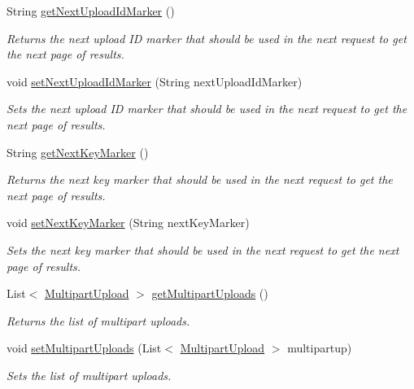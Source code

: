 \begin{DoxyCompactItemize}
String \hyperlink{classorg_1_1jcs_1_1dss_1_1main_1_1MultipartUploadListing_a1d18addca6cd5af22f70b7beb16a60d3}{get\+Next\+Upload\+Id\+Marker} ()
\begin{DoxyCompactList}\small\item\em Returns the next upload ID marker that should be used in the next request to get the next page of results. \end{DoxyCompactList}\item 
void \hyperlink{classorg_1_1jcs_1_1dss_1_1main_1_1MultipartUploadListing_a9e0f89f2000c7ee64390ee7a2616587a}{set\+Next\+Upload\+Id\+Marker} (String next\+Upload\+Id\+Marker)
\begin{DoxyCompactList}\small\item\em Sets the next upload ID marker that should be used in the next request to get the next page of results. \end{DoxyCompactList}\item 
String \hyperlink{classorg_1_1jcs_1_1dss_1_1main_1_1MultipartUploadListing_a3eb1485aa2d9624cfb29576ccd7efd80}{get\+Next\+Key\+Marker} ()
\begin{DoxyCompactList}\small\item\em Returns the next key marker that should be used in the next request to get the next page of results. \end{DoxyCompactList}\item 
void \hyperlink{classorg_1_1jcs_1_1dss_1_1main_1_1MultipartUploadListing_a2cf0e0c3b38a393ed5f66490c33d77c4}{set\+Next\+Key\+Marker} (String next\+Key\+Marker)
\begin{DoxyCompactList}\small\item\em Sets the next key marker that should be used in the next request to get the next page of results. \end{DoxyCompactList}\item 
List$<$ \hyperlink{classorg_1_1jcs_1_1dss_1_1main_1_1MultipartUpload}{Multipart\+Upload} $>$ \hyperlink{classorg_1_1jcs_1_1dss_1_1main_1_1MultipartUploadListing_a359ddf97581ef5b201ea933bc0d7f3bc}{get\+Multipart\+Uploads} ()
\begin{DoxyCompactList}\small\item\em Returns the list of multipart uploads. \end{DoxyCompactList}\item 
void \hyperlink{classorg_1_1jcs_1_1dss_1_1main_1_1MultipartUploadListing_aceecc83867e33bd0d965b372b3261f44}{set\+Multipart\+Uploads} (List$<$ \hyperlink{classorg_1_1jcs_1_1dss_1_1main_1_1MultipartUpload}{Multipart\+Upload} $>$ multipartup)
\begin{DoxyCompactList}\small\item\em Sets the list of multipart uploads. \end{DoxyCompactList}\end{DoxyCompactItemize}


